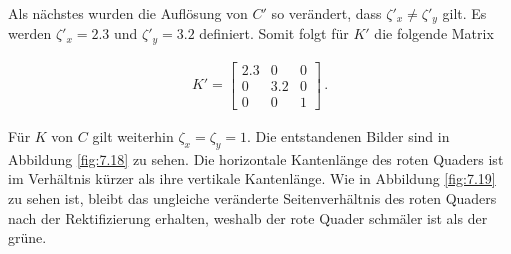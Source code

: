 Als nächstes wurden die Auflösung von $C'$ so verändert, dass $\zeta'_x \neq \zeta'_y$ gilt. Es werden $\zeta'_x = 2.3$  und $\zeta'_y = 3.2$ definiert. Somit folgt für $K'$ die folgende Matrix

\begin{gather}
	K' = 
	\begin{bmatrix}
	2.3&0&0\\
	0&3.2&0\\
	0&0&1
	\end{bmatrix} \, .
\end{gather}

Für $K$ von $C$ gilt weiterhin $\zeta_x = \zeta_y = 1$. Die entstandenen Bilder sind in Abbildung \ref{fig:7.18} zu sehen. Die horizontale Kantenlänge des roten Quaders ist im Verhältnis kürzer als ihre vertikale Kantenlänge. Wie in Abbildung \ref{fig:7.19} zu sehen ist, bleibt das ungleiche veränderte Seitenverhältnis des roten Quaders nach der Rektifizierung erhalten, weshalb der rote Quader schmäler ist als der grüne.


